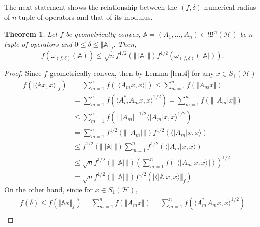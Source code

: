 \documentclass[12pt]{article}
\newtheorem{theorem}{Theorem}
\begin{document}
The next statement shows the relationship between the $(f,\delta)$-numerical radius of $n$-tuple of operators and that of its modulus.
\begin{theorem}
\label{thm6}
Let $ f $ be geometrically convex, $  \mathbb{A} = (A_1, \ldots, A_n) \in \mathfrak{B}^{n}(\mathcal{H}) $ be $n$-tuple of operators and   $
0\leq \delta\leq \Vert \mathbb{A}  \Vert_{f}.$ Then,
\[
f\left( \omega_{(f,\delta )}(\mathbb{A}  ) \right) \leq \sqrt{n}f^{1/2}\left( \Vert \ \vert \mathbb{A}  \vert \ \Vert \right) f^{1/2}\left( \omega_{(f,\delta)}(\vert \mathbb{A} \vert) \right).
\]
\end{theorem}
\begin{proof}
Since $ f $ geometrically convex, then by Lemma \ref{lem4} for any $ x\in S_{1}(\mathcal{H}) $
\begin{align}
\label{equ16}
f\left( \vert \langle \mathbb{A}x,x \rangle  \vert_{f}  \right)  & = \sum\limits_{m=1}^{n} f\left( \vert \langle A_{m}x,x \rangle  \vert  \right) \leq \sum\limits_{m=1}^{n}f\left( \Vert A_{m}x \Vert \right) \nonumber \\
&=\sum\limits_{m=1}^{n}f\left( \langle A_{m}^{*}A_{m}x,x\rangle^{1/2} \right)  =\sum\limits_{m=1}^{n}f\left(\Vert \ \vert A_{m}\vert x \Vert\right) \nonumber  \\
&\leq \sum\limits_{m=1}^{n}f\left(  \Vert \ \vert A_{m} \vert \ \Vert^{1/2}\langle \vert A_{m}\vert x,x\rangle^{1/2}\right) \nonumber \\
&= \sum\limits_{m=1}^{n} f^{1/2}\left(  \Vert \ \vert A_{m} \vert \ \Vert\right) f^{1/2}\left( \langle \vert A_{m}\vert x,x\rangle\right) \nonumber  \\
&\leq f^{1/2}\left( \Vert \ \vert \mathbb{A} \vert \ \Vert \right) \sum\limits_{m=1}^{n} f^{1/2}\left( \langle \vert A_{m}\vert x,x\rangle\right) \nonumber  \\
&\leq \sqrt{n} f^{1/2}\left( \Vert \ \vert \mathbb{A} \vert \ \Vert \right) \left( \sum\limits_{m=1}^{n} f\left( \vert \langle \vert A_{m}\vert x,x\rangle\vert\right)\right) ^{1/2} \nonumber  \\
&=\sqrt{n} f^{1/2}\left( \Vert \ \vert \mathbb{A} \vert \ \Vert \right) f^{1/2}\left( \vert \langle \vert \mathbb{A}\vert x,x\rangle \Vert_{f}\right).
\end{align}
On the other hand, since for $ x\in S_{1}(\mathcal{H}),$
\begin{multline*}
f(\delta) \leq f\left( \Vert \mathbb{A}x \Vert_{f} \right) = \sum\limits_{m=1}^{n} f\left( \Vert A_{m}x \Vert \right)
= \sum\limits_{m=1}^{n} f\left( \langle A_{m}^{*}A_{m}x,x\rangle^{1/2} \right) \\

\end{multline*}
\end{proof}
\end{document}
